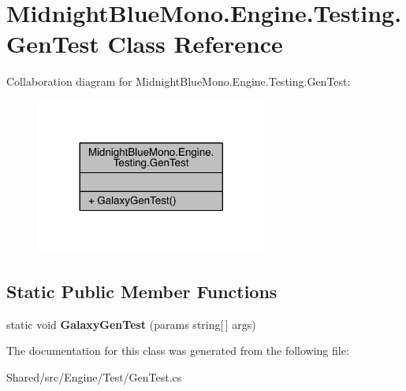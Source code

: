\hypertarget{class_midnight_blue_mono_1_1_engine_1_1_testing_1_1_gen_test}{}\section{Midnight\+Blue\+Mono.\+Engine.\+Testing.\+Gen\+Test Class Reference}
\label{class_midnight_blue_mono_1_1_engine_1_1_testing_1_1_gen_test}


Collaboration diagram for Midnight\+Blue\+Mono.\+Engine.\+Testing.\+Gen\+Test\+:
\nopagebreak
\begin{figure}[H]
\begin{center}
\leavevmode
\includegraphics[width=216pt]{class_midnight_blue_mono_1_1_engine_1_1_testing_1_1_gen_test__coll__graph}
\end{center}
\end{figure}
\subsection*{Static Public Member Functions}
\begin{DoxyCompactItemize}
\item 
\hypertarget{class_midnight_blue_mono_1_1_engine_1_1_testing_1_1_gen_test_a8a210dcede07b5df5dc9149e34d23413}{}\label{class_midnight_blue_mono_1_1_engine_1_1_testing_1_1_gen_test_a8a210dcede07b5df5dc9149e34d23413} 
static void {\bfseries Galaxy\+Gen\+Test} (params string\mbox{[}$\,$\mbox{]} args)
\end{DoxyCompactItemize}


The documentation for this class was generated from the following file\+:\begin{DoxyCompactItemize}
\item 
Shared/src/\+Engine/\+Test/Gen\+Test.\+cs\end{DoxyCompactItemize}
